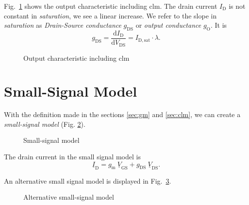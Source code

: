 \documentclass{article}[11pt]
\begin{document}
\medskip

Fig.~\ref{fig:squarelaw-output-clm} shows the output characteristic 
including \gls{clm}.
The drain current $I_{\mathrm{D}}$ is not constant in \textit{saturation},
we see a linear increase.
We refer to the slope in \textit{saturation} as 
\textit{Drain-Source conductance} $g_{\mathrm{DS}}$ or 
\textit{output conductance} $g_{\mathrm{O}}$.
It is
\begin{equation}\label{eq:gds}
g_{\mathrm{DS}} = \frac{\mathrm{d} I_{\mathrm{D}}}{\mathrm{d} V_{\mathrm{DS}}} 
                = I_{\mathrm{D,sat}} \cdot \lambda.
\end{equation}

\begin{figure}[H]
  \centering
  \begin{tikzpicture}[scale=1.2]
    
  \end{tikzpicture} 
  \caption{Output characteristic including \gls{clm}}
  \label{fig:squarelaw-output-clm}
\end{figure}

\section{Small-Signal Model}

With the definition made in the sections \ref{sec:gm} and \ref{sec:clm},
we can create a \textit{small-signal model} 
(Fig. \ref{fig:squarelaw-small-signal}).

\begin{figure}[H]
  \centering
  \begin{circuitikz}
    
  \end{circuitikz} 
  \caption{Small-signal model}
  \label{fig:squarelaw-small-signal}
\end{figure}


The drain current in the small signal model is
\begin{equation}\label{eq:id-ss}
\underline{I}_{\mathrm{D}} =  
g_{\mathrm{m}} \ \underline{V}_{\mathrm{GS}} 
+ g_{\mathrm{DS}} \ \underline{V}_{\mathrm{DS}}.
\end{equation}

An alternative small signal model is displayed in 
Fig.~\ref{fig:alt-squarelaw-small-signal}.

\begin{figure}[H]
  \centering
  \begin{circuitikz}
    
  \end{circuitikz} 
  \caption{Alternative small-signal model \cite[section 7.2.1]{seda-miccirc-20}}
  \label{fig:alt-squarelaw-small-signal}
\end{figure}

\printbibliography
\end{document}
